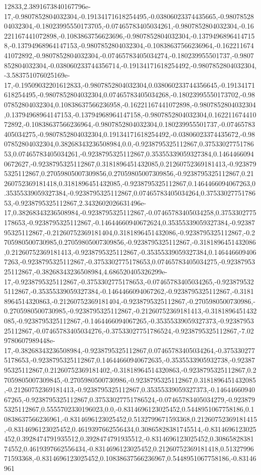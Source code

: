 12833,2.3891673840167796e-17,-0.9807852804032304,-0.19134171618254495,-0.03806023374435665,-0.9807852804032304,-0.18023995550173705,-0.07465783405034261,-0.9807852804032304,-0.16221167441072898,-0.1083863756623696,-0.9807852804032304,-0.13794968964147158,-0.13794968964147153,-0.9807852804032304,-0.10838637566236964,-0.16221167441072892,-0.9807852804032304,-0.07465783405034274,-0.180239955501737,-0.9807852804032304,-0.038060233744356714,-0.19134171618254492,-0.9807852804032304,-3.583751076025169e-17,-0.19509032201612833,-0.9807852804032304,0.038060233744356645,-0.19134171618254495,-0.9807852804032304,0.07465783405034268,-0.18023995550173702,-0.9807852804032304,0.10838637566236958,-0.16221167441072898,-0.9807852804032304,0.13794968964147153,-0.13794968964147158,-0.9807852804032304,0.16221167441072892,-0.10838637566236964,-0.9807852804032304,0.180239955501737,-0.07465783405034275,-0.9807852804032304,0.19134171618254492,-0.03806023374435672,-0.9807852804032304,0.38268343236508984,0.0,-0.9238795325112867,0.3753302775178653,0.07465783405034261,-0.9238795325112867,0.35355339059327384,0.14644660940672627,-0.9238795325112867,0.3181896451432085,0.21260752369181413,-0.9238795325112867,0.27059805007309856,0.27059805007309856,-0.9238795325112867,0.21260752369181418,0.3181896451432085,-0.9238795325112867,0.1464466094067263,0.35355339059327384,-0.9238795325112867,0.07465783405034264,0.3753302775178653,-0.9238795325112867,2.3432602026631496e-17,0.38268343236508984,-0.9238795325112867,-0.07465783405034258,0.3753302775178653,-0.9238795325112867,-0.14644660940672624,0.35355339059327384,-0.9238795325112867,-0.21260752369181404,0.3181896451432086,-0.9238795325112867,-0.2705980500730985,0.27059805007309856,-0.9238795325112867,-0.3181896451432086,0.21260752369181413,-0.9238795325112867,-0.35355339059327384,0.1464466094067263,-0.9238795325112867,-0.3753302775178653,0.07465783405034275,-0.9238795325112867,-0.38268343236508984,4.686520405326299e-17,-0.9238795325112867,-0.3753302775178653,-0.07465783405034265,-0.9238795325112867,-0.35355339059327384,-0.1464466094067262,-0.9238795325112867,-0.31818964514320863,-0.21260752369181404,-0.9238795325112867,-0.2705980500730986,-0.2705980500730985,-0.9238795325112867,-0.21260752369181413,-0.3181896451432085,-0.9238795325112867,-0.1464466094067265,-0.35355339059327373,-0.9238795325112867,-0.07465783405034276,-0.37533027751786524,-0.9238795325112867,-7.029780607989448e-17,-0.38268343236508984,-0.9238795325112867,0.07465783405034264,-0.3753302775178653,-0.9238795325112867,0.14644660940672635,-0.3535533905932738,-0.9238795325112867,0.21260752369181402,-0.31818964514320863,-0.9238795325112867,0.27059805007309845,-0.2705980500730986,-0.9238795325112867,0.3181896451432085,-0.21260752369181413,-0.9238795325112867,0.35355339059327373,-0.1464466094067265,-0.9238795325112867,0.37533027751786524,-0.07465783405034279,-0.9238795325112867,0.5555702330196023,0.0,-0.8314696123025452,0.5448951067758186,0.10838637566236961,-0.8314696123025452,0.5132799671593368,0.21260752369181415,-0.8314696123025452,0.4619397662556434,0.30865828381745514,-0.8314696123025452,0.3928474791935512,0.3928474791935512,-0.8314696123025452,0.3086582838174552,0.4619397662556434,-0.8314696123025452,0.21260752369181418,0.5132799671593368,-0.8314696123025452,0.10838637566236967,0.5448951067758186,-0.83146961